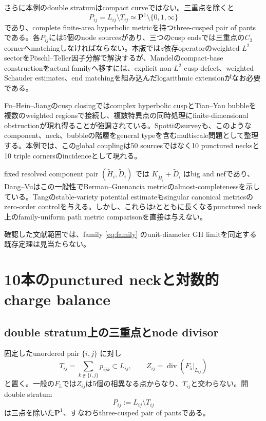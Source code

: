 \documentclass[11pt,a4paper]{ltjsarticle}
\theoremstyle{definition}
\theoremstyle{remark}
\newcommand{\PP}{\mathbf P}
\begin{document}
さらに本例のdouble stratumはcompact curveではない。三重点を除くと
\[
 P_{ij}=L_{ij}\setminus T_{ij}\simeq\PP^1\setminus\{0,1,\infty\}
\]
であり、complete finite-area hyperbolic metricを持つthree-cusped pair of pantsである。各$P_{ij}$には5個のnode sourcesがあり、三つのcusp endsでは三重点の$C_3$ cornerへmatchingしなければならない。本版では$z$依存operatorのweighted $L^2$ sectorをPöschl--Teller因子分解で解決するが、Mandelのcompact-base constructionをactual familyへ移すには、explicit non-$L^2$ cusp defect、weighted Schauder estimates、end matchingを組み込んだlogarithmic extensionがなお必要である。

Fu--Hein--Jiangのcusp closingではcomplex hyperbolic cuspとTian--Yau bubbleを複数のweighted regionsで接続し、複数特異点の同時処理にfinite-dimensional obstructionが現れ得ることが強調されている\cite{FuHeinJiang}。Spottiのsurveyも、このようなcomponent、neck、bubbleの階層をgeneral typeを含むmultiscale問題として整理する\cite{Spotti}。本例では、このglobal couplingは50 sourcesではなく10 punctured necksと10 triple cornersのincidenceとして現れる。

fixed resolved component pair $(\widetilde H_i,\widetilde D_i)$ では
$K_{\widetilde H_i}+\widetilde D_i$ はbig and nefであり、Dang--Vuはこの一般性でBerman--Guenancia metricのalmost-completenessを示している\cite{DangVu}。Tangのstable-variety potential estimateもsingular canonical metricsのzero-order controlを与える\cite{Tang}。しかし、これらは$t$とともに長くなるpunctured neck上のfamily-uniform path metric comparisonを直接は与えない。

確認した文献範囲では、family \eqref{eq:family} のunit-diameter GH limitを同定する既存定理は見当たらない。


\section{10本のpunctured neckと対数的charge balance}
\label{sec:punctured-necks}

\subsection{double stratum上の三重点とnode divisor}

固定したunordered pair $\{i,j\}$ に対し
\[
 T_{ij}=\sum_{k\notin\{i,j\}}p_{ijk}\subset L_{ij},
 \qquad
 Z_{ij}=\operatorname{div}(F_5|_{L_{ij}})
\]
と置く。一般の$F_5$では$Z_{ij}$は5個の相異なる点からなり、$T_{ij}$と交わらない。開double stratum
\[
 P_{ij}:=L_{ij}\setminus T_{ij}
\]
は三点を除いた$\PP^1$、すなわちthree-cusped pair of pantsである。
\end{document}
